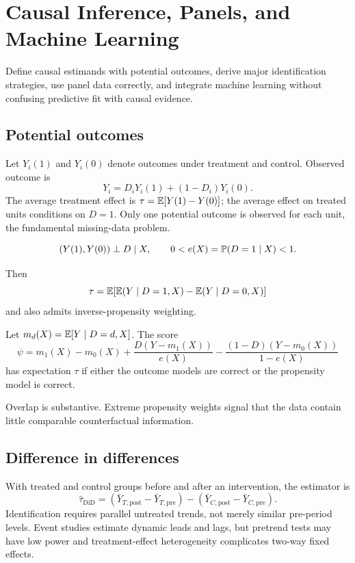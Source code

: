 \chapter{Causal Inference, Panels, and Machine Learning}

\begin{objectives}
Define causal estimands with potential outcomes, derive major identification
strategies, use panel data correctly, and integrate machine learning without
confusing predictive fit with causal evidence.
\end{objectives}

\section{Potential outcomes}

Let $Y_i(1)$ and $Y_i(0)$ denote outcomes under treatment and control. Observed
outcome is
\[
Y_i=D_iY_i(1)+(1-D_i)Y_i(0).
\]
The average treatment effect is
$\tau=\operatorname{\mathbb E}[Y(1)-Y(0)]$; the average effect on treated units conditions on $D=1$.
Only one potential outcome is observed for each unit, the fundamental missing-data
problem.

\begin{assumption}
\[
(Y(1),Y(0))\perp D\mid X,\qquad
0<e(X)=\mathbb P(D=1\mid X)<1.
\]
\end{assumption}

Then
\[
\tau=\operatorname{\mathbb E}[\operatorname{\mathbb E}(Y\mid D=1,X)-\operatorname{\mathbb E}(Y\mid D=0,X)]
\]
and also admits inverse-propensity weighting.

\begin{proposition}
Let $m_d(X)=\operatorname{\mathbb E}[Y\mid D=d,X]$. The score
\[
\psi=
m_1(X)-m_0(X)
+\frac{D(Y-m_1(X))}{e(X)}
-\frac{(1-D)(Y-m_0(X))}{1-e(X)}
\]
has expectation $\tau$ if either the outcome models are correct or the propensity
model is correct.
\end{proposition}

Overlap is substantive. Extreme propensity weights signal that the data contain
little comparable counterfactual information.

\section{Difference in differences}

With treated and control groups before and after an intervention, the estimator is
\[
\widehat\tau_{\mathrm{DiD}}
=(\bar Y_{T,\mathrm{post}}-\bar Y_{T,\mathrm{pre}})
-(\bar Y_{C,\mathrm{post}}-\bar Y_{C,\mathrm{pre}}).
\]
Identification requires parallel untreated trends, not merely similar pre-period
levels. Event studies estimate dynamic leads and lags, but pretrend tests may have
low power and treatment-effect heterogeneity complicates two-way fixed effects.

